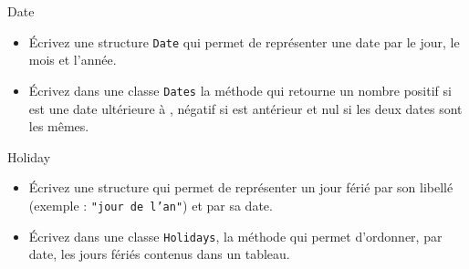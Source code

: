 \documentclass[a4paper,11pt]{article}
\begin{document}
	\begin{Exercice}{Date}
		\begin{itemize}
			\item
				Écrivez une structure \texttt{Date} qui permet de représenter une date par le jour, le mois et l'année.
			\item 
				Écrivez dans une classe \texttt{Dates} la méthode  qui retourne un nombre positif si  est une date ultérieure à , négatif si  est antérieur et nul si les deux dates sont les mêmes.
		\end{itemize}		
	\end{Exercice}

	\begin{Exercice}{Holiday}
		\begin{itemize}
			\item
				Écrivez une structure qui permet de représenter un jour férié par son libellé (exemple : \texttt{"jour de l'an"}) et par sa date.
			\item 
				Écrivez dans une classe \texttt{Holidays}, la méthode  qui permet d'ordonner, par date, les jours fériés contenus dans un tableau.
		\end{itemize}		
	\end{Exercice}
\end{document}
